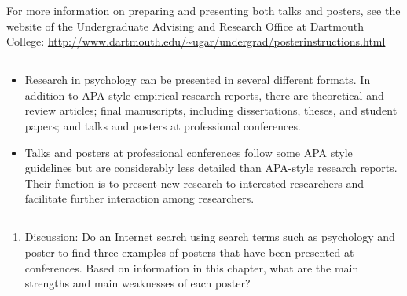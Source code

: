 For more information on preparing and presenting both talks and posters, see the website of the Undergraduate Advising and Research Office at Dartmouth College: \url{http://www.dartmouth.edu/~ugar/undergrad/posterinstructions.html}

\subsection{}
\begin{fullwidth}
\begin{itemize}
\item Research in psychology can be presented in several different formats. In addition to APA-style empirical research reports, there are theoretical and review articles; final manuscripts, including dissertations, theses, and student papers; and talks and posters at professional conferences.

\item Talks and posters at professional conferences follow some APA style guidelines but are considerably less detailed than APA-style research reports. Their function is to present new research to interested researchers and facilitate further interaction among researchers.
 
\end{itemize}
\end{fullwidth}

 

\subsection{}
\begin{fullwidth}
\begin{enumerate}
\item Discussion: Do an Internet search using search terms such as psychology and poster to find three examples of posters that have been presented at conferences. Based on information in this chapter, what are the main strengths and main weaknesses of each poster?
\end{enumerate}
\end{fullwidth}  
